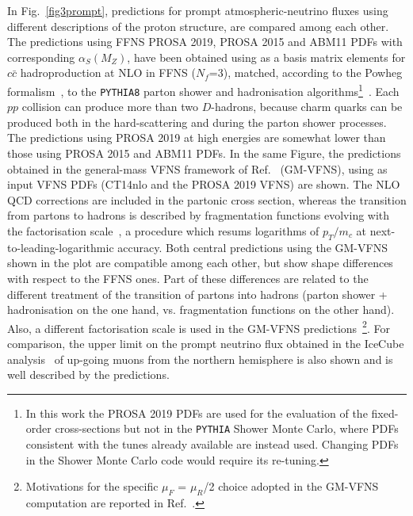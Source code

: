 In Fig.~\ref{fig3prompt}, predictions for prompt atmospheric-neutrino fluxes using different descriptions of the proton structure, are compared among each other. The predictions using FFNS PROSA 2019, PROSA 2015 and ABM11 PDFs with corresponding $\alpha_S(M_Z)$, have been obtained using as a basis matrix elements for $c\bar{c}$ hadroproduction at NLO in FFNS ($N_f$=3), matched, according to the Powheg formalism~\cite{Nason:2004rx, Frixione:2007nw}, to the {\texttt{PYTHIA8}} parton shower and hadronisation algorithms\footnote{In this work the PROSA 2019 PDFs are used for the evaluation of the fixed-order cross-sections but not in the {\texttt{PYTHIA}} Shower Monte Carlo, where PDFs consistent with the tunes already available are instead used. Changing PDFs in the Shower Monte Carlo code would require its re-tuning.}~\cite{Sjostrand:2014zea}. Each $pp$ collision can produce more than two $D$-hadrons, because charm quarks can be produced both in the hard-scattering and during the parton shower processes. 
The predictions using PROSA 2019 at high energies are somewhat lower than those using PROSA 2015 and ABM11 PDFs.
In the same Figure, the predictions obtained in the general-mass VFNS framework of Ref.~\cite{Benzke:2017yjn} (GM-VFNS), using as input 
VFNS PDFs (CT14nlo and the PROSA 2019 VFNS) are shown. The NLO QCD corrections are included in the partonic cross section, whereas the transition from partons to hadrons is described by fragmentation functions evolving with the factorisation scale~\cite{Kneesch:2007ey}, 
a procedure which resums logarithms of $p_T/m_c$ at next-to-leading-logarithmic accuracy. Both central predictions using the GM-VFNS shown in the plot are compatible among each other, but show shape differences with respect to the FFNS ones. Part of these differences are related to the different treatment of the transition of partons into hadrons (parton shower + hadronisation on the one hand, vs. fragmentation functions on the other hand). Also, a different factorisation scale is used in the GM-VFNS predictions~\footnote{Motivations for the specific $\mu_F$ = $\mu_R$/2 choice adopted in the GM-VFNS computation are reported in Ref.~\cite{Benzke:2017yjn}.}. For comparison, the upper limit on the prompt neutrino flux obtained in the IceCube analysis~\cite{Aartsen:2016xlq} of up-going muons 
from the northern hemisphere is also shown and is well described by the predictions. 

